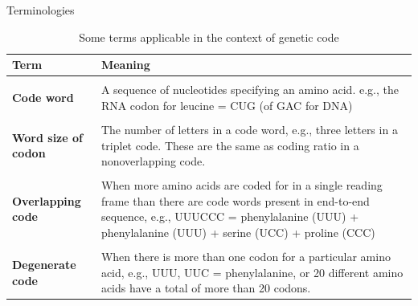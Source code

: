 \documentclass[11pt,dvipsnames,ignorenonframetext,aspectratio=169]{beamer}
\begin{document}
\begin{frame}{Terminologies}
\protect\hypertarget{terminologies}{}
\begin{table}

\caption{\label{tab:gene-terms1}Some terms applicable in the context of genetic code}
\centering
\fontsize{6}{8}\selectfont
\begin{tabular}[t]{>{\raggedright\arraybackslash}p{8em}>{\raggedright\arraybackslash}p{38em}}
\toprule
Term & Meaning\\
\midrule
\textbf{\cellcolor{gray!6}{Code letter}} & \cellcolor{gray!6}{A nucleotide e.g., A, U, G, C (in mRNA) or A, T, G, C (in DNA)}\\
\textbf{Code word} & A sequence of nucleotides specifying an amino acid. e.g., the RNA codon for leucine = CUG (of GAC for DNA)\\
\textbf{\cellcolor{gray!6}{Anticodon}} & \cellcolor{gray!6}{A sequence of nucleotides on tRNA that complements the codon, e.g., GAC = anticodon for leucine}\\
\textbf{Word size of codon} & The number of letters in a code word, e.g., three letters in a triplet code. These are the same as coding ratio in a nonoverlapping code.\\
\textbf{\cellcolor{gray!6}{Non overlapping code}} & \cellcolor{gray!6}{A code in which only as many amino acids are coded as there are code words in end-to-end sequence, e.g., for a triplet code UUUCCC = phenylalanine (UUU) + proline (CCC)}\\
\addlinespace
\textbf{Overlapping code} & When more amino acids are coded for in a single reading frame than there are code words present in end-to-end sequence, e.g., UUUCCC = phenylalanine (UUU) + phenylalanine (UUU) + serine (UCC) + proline (CCC)\\
\textbf{\cellcolor{gray!6}{Nondegenerate code}} & \cellcolor{gray!6}{When there is only one codon for each amono acid, e.g., 20 different amino acids have a total of 20 codons.}\\
\textbf{Degenerate code} & When there is more than one codon for a particular amino acid, e.g., UUU, UUC = phenylalanine, or 20 different amino acids have a total of more than 20 codons.\\
\bottomrule
\end{tabular}
\end{table}
\end{frame}
\end{document}
